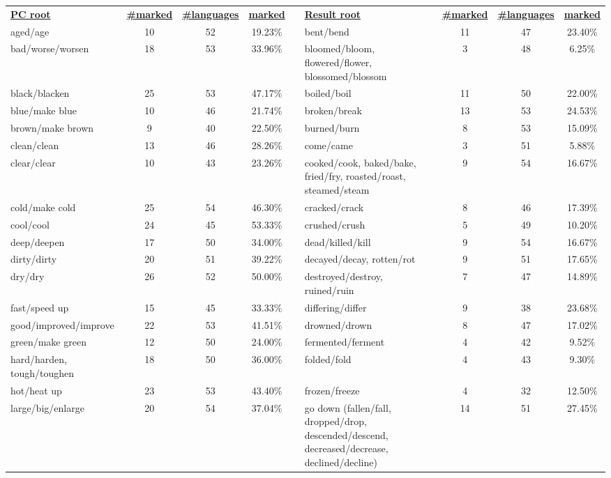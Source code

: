 \begin{tabular}{p{3cm}ccccp{3cm}ccc}
\underline{\textbf{PC root}} & \underline{\textbf{\#marked}} & \underline{\textbf{\#languages}} & \underline{\textbf{marked}} & & \underline{\textbf{Result root}} & \underline{\textbf{\#marked}} & \underline{\textbf{\#languages}} & \underline{\textbf{marked}} \\
aged/age & 10 & 52 & 19.23\% & & bent/bend & 11 & 47 & 23.40\% \\
bad/worse/worsen & 18 & 53 & 33.96\% & & bloomed/bloom, flowered/flower, blossomed/blossom & 3 & 48 & 6.25\% \\
black/blacken & 25 & 53 & 47.17\% & & boiled/boil & 11 & 50 & 22.00\% \\
blue/make blue & 10 & 46 & 21.74\% & & broken/break & 13 & 53 & 24.53\% \\
brown/make brown & 9 & 40 & 22.50\% & & burned/burn & 8 & 53 & 15.09\% \\
clean/clean & 13 & 46 & 28.26\% & & come/came & 3 & 51 & 5.88\% \\
clear/clear & 10 & 43 & 23.26\% & & cooked/cook, baked/bake, fried/fry, roasted/roast, steamed/steam & 9 & 54 & 16.67\% \\
cold/make cold & 25 & 54 & 46.30\% & & cracked/crack & 8 & 46 & 17.39\% \\
cool/cool & 24 & 45 & 53.33\% & & crushed/crush & 5 & 49 & 10.20\% \\
deep/deepen & 17 & 50 & 34.00\% & & dead/killed/kill & 9 & 54 & 16.67\% \\
dirty/dirty & 20 & 51 & 39.22\% & & decayed/decay, rotten/rot & 9 & 51 & 17.65\% \\
dry/dry & 26 & 52 & 50.00\% & & destroyed/destroy, ruined/ruin & 7 & 47 & 14.89\% \\
fast/speed up & 15 & 45 & 33.33\% & & differing/differ & 9 & 38 & 23.68\% \\
good/improved/improve & 22 & 53 & 41.51\% & & drowned/drown & 8 & 47 & 17.02\% \\
green/make green & 12 & 50 & 24.00\% & & fermented/ferment & 4 & 42 & 9.52\% \\
hard/harden, tough/toughen & 18 & 50 & 36.00\% & & folded/fold & 4 & 43 & 9.30\% \\
hot/heat up & 23 & 53 & 43.40\% & & frozen/freeze & 4 & 32 & 12.50\% \\
large/big/enlarge & 20 & 54 & 37.04\% & & go down (fallen/fall, dropped/drop, descended/descend, decreased/decrease, declined/decline) & 14 & 51 & 27.45\% \\

\end{tabular}
